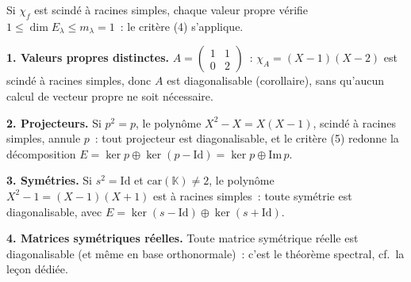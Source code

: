 Si $\chi_f$ est scindé à racines simples, chaque valeur propre vérifie
$1 \leq \dim E_\lambda \leq m_\lambda = 1$~: le critère (4) s'applique.

\decsep{}



\begin{mdframed}[style=exbar]
  \textbf{1. Valeurs propres distinctes.}\enspace%
  $A = \begin{pmatrix}1&1\\0&2\end{pmatrix}$~: $\chi_A = (X-1)(X-2)$ est
  scindé à racines simples, donc $A$ est diagonalisable (corollaire), sans
  qu'aucun calcul de vecteur propre ne soit nécessaire.

  \smallskip\noindent
  \textbf{2. Projecteurs.}\enspace%
  Si $p^2 = p$, le polynôme $X^2 - X = X(X-1)$, scindé à racines simples,
  annule $p$~: tout projecteur est diagonalisable, et le critère (5) redonne
  la décomposition $E = \ker p \oplus \ker(p - \mathrm{Id}) = \ker p \oplus \mathrm{Im}\,p$.

  \smallskip\noindent
  \textbf{3. Symétries.}\enspace%
  Si $s^2 = \mathrm{Id}$ et $\mathrm{car}(\mathbb{K}) \neq 2$, le polynôme
  $X^2 - 1 = (X-1)(X+1)$ est à racines simples~: toute symétrie est
  diagonalisable, avec $E = \ker(s-\mathrm{Id}) \oplus \ker(s+\mathrm{Id})$.

  \smallskip\noindent
  \textbf{4. Matrices symétriques réelles.}\enspace%
  Toute matrice symétrique réelle est diagonalisable (et même en base
  orthonormale)~: c'est le théorème spectral, cf.\ la leçon dédiée.
\end{mdframed}


